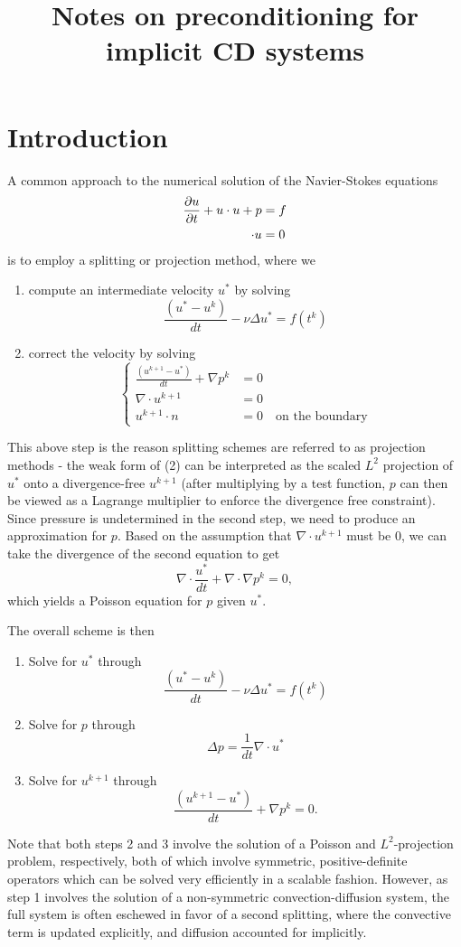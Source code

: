 \documentclass[final,leqno]{siamltex}
\title{Notes on preconditioning for implicit CD systems}
\let\grad\relax
\newcommand{\grad}{\nabla}
\renewcommand{\div}{\grad \cdot}
\newcommand{\pd}[2]{\frac{\partial#1}{\partial#2}}
\begin{document}
\maketitle

\section{Introduction}

A common approach to the numerical solution of the Navier-Stokes equations
\begin{align*}
\pd{u}{t} + u\cdot\grad u + \grad p &= f \\
\div u &= 0
\end{align*}
is to employ a splitting or projection method, where we 
\begin{enumerate}
\item compute an intermediate velocity $u^*$ by solving $$\frac{(u^*-u^k)}{dt} - \nu\Delta u^* = f(t^k)$$
\item correct the velocity by solving 
$$\begin{cases}
\frac{(u^{k+1}-u^*)}{dt} + \nabla p^k &= 0\\
\nabla \cdot u^{k+1} &= 0\\
u^{k+1}\cdot n &= 0 \quad \text{on the boundary}
\end{cases}$$
\end{enumerate}
This above step is the reason splitting schemes are referred to as projection methods - the weak form of (2) can be interpreted as the scaled $L^2$ projection of $u^*$ onto a divergence-free $u^{k+1}$ (after multiplying by a test function, $p$ can then be viewed as a Lagrange multiplier to enforce the divergence free constraint).  Since pressure is undetermined in the second step, we need to produce an approximation for $p$.  Based on the assumption that $\nabla \cdot u^{k+1}$ must be $0$, we can take the divergence of the second equation to get $$\nabla \cdot \frac{u^*}{dt} + \nabla\cdot \nabla p^k = 0,$$ which yields a Poisson equation for $p$ given $u^*$. 

The overall scheme is then 
\begin{enumerate}
\item Solve for $u^*$ through $$\frac{(u^*-u^k)}{dt} - \nu\Delta u^* = f(t^k)$$
\item  Solve for $p$ through $$\Delta p = \frac{1}{dt}\nabla \cdot u^*$$
\item Solve for $u^{k+1}$ through $$\frac{(u^{k+1}-u^*)}{dt} + \nabla p^k = 0.$$
\end{enumerate}
Note that both steps 2 and 3 involve the solution of a Poisson and $L^2$-projection problem, respectively, both of which involve symmetric, positive-definite operators which can be solved very efficiently in a scalable fashion.  However, as step 1 involves the solution of a non-symmetric convection-diffusion system, the full system is often eschewed in favor of a second splitting, where the convective term is updated explicitly, and diffusion accounted for implicitly.  
\end{document}
